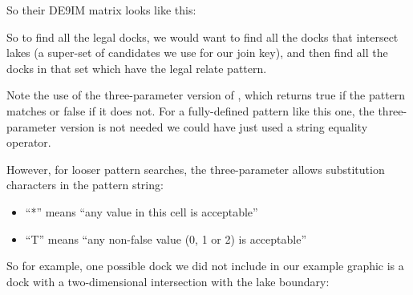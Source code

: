 \documentclass[a4paper,11pt,english]{sphinxmanual}
\begin{document}
So their DE9IM matrix looks like this:

\noindent{}

So to find all the legal docks, we would want to find all the docks that intersect lakes (a super-set of  candidates we use for our join key), and then find all the docks in that set which have the legal relate pattern.

\begin{sphinxVerbatim}[commandchars=\\\{\}]
 
      
   

\end{sphinxVerbatim}

Note the use of the three-parameter version of , which returns true if the pattern matches or false if it does not. For a fully-defined pattern like this one, the three-parameter version is not needed \textendash{} we could have just used a string equality operator.

However, for looser pattern searches, the three-parameter allows substitution characters in the pattern string:
\begin{itemize}
\item {} 
“*” means “any value in this cell is acceptable”

\item {} 
“T” means “any non-false value (0, 1 or 2) is acceptable”

\end{itemize}

So for example, one possible dock we did not include in our example graphic is a dock with a two-dimensional intersection with the lake boundary:

\begin{sphinxVerbatim}[commandchars=\\\{\}]
      
   
\end{sphinxVerbatim}
\end{document}
